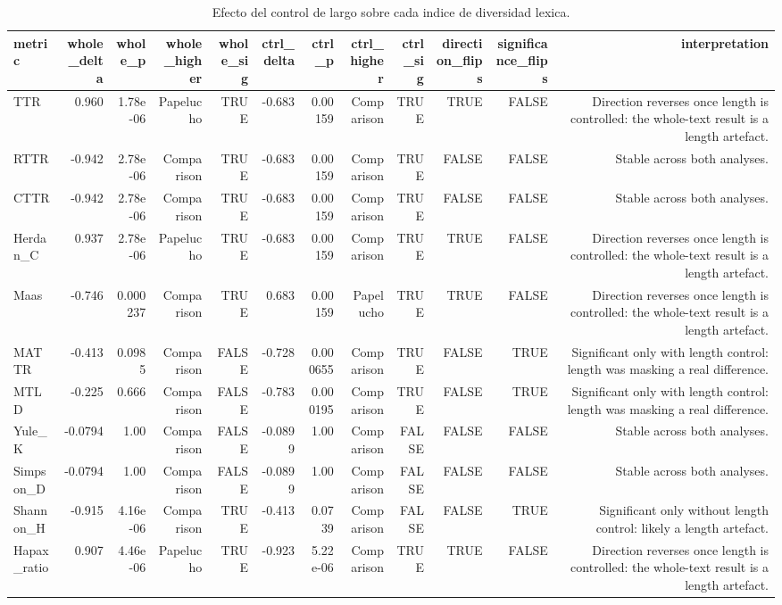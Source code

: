 \begin{table}[htbp]
\centering
\small
\caption{Efecto del control de largo sobre cada indice de diversidad lexica.}
\label{tab:lexical-contrast-es}
\begin{tabular}{lrrrrrrrrrrr}
\toprule
\textbf{metric} & \textbf{whole\_delta} & \textbf{whole\_p} & \textbf{whole\_higher} & \textbf{whole\_sig} & \textbf{ctrl\_delta} & \textbf{ctrl\_p} & \textbf{ctrl\_higher} & \textbf{ctrl\_sig} & \textbf{direction\_flips} & \textbf{significance\_flips} & \textbf{interpretation} \\
\midrule
TTR & 0.960 & 1.78e-06 & Papelucho & TRUE & -0.683 & 0.00159 & Comparison & TRUE & TRUE & FALSE & Direction reverses once length is controlled: the whole-text result is a length artefact. \\
RTTR & -0.942 & 2.78e-06 & Comparison & TRUE & -0.683 & 0.00159 & Comparison & TRUE & FALSE & FALSE & Stable across both analyses. \\
CTTR & -0.942 & 2.78e-06 & Comparison & TRUE & -0.683 & 0.00159 & Comparison & TRUE & FALSE & FALSE & Stable across both analyses. \\
Herdan\_C & 0.937 & 2.78e-06 & Papelucho & TRUE & -0.683 & 0.00159 & Comparison & TRUE & TRUE & FALSE & Direction reverses once length is controlled: the whole-text result is a length artefact. \\
Maas & -0.746 & 0.000237 & Comparison & TRUE & 0.683 & 0.00159 & Papelucho & TRUE & TRUE & FALSE & Direction reverses once length is controlled: the whole-text result is a length artefact. \\
MATTR & -0.413 & 0.0985 & Comparison & FALSE & -0.728 & 0.000655 & Comparison & TRUE & FALSE & TRUE & Significant only with length control: length was masking a real difference. \\
MTLD & -0.225 & 0.666 & Comparison & FALSE & -0.783 & 0.000195 & Comparison & TRUE & FALSE & TRUE & Significant only with length control: length was masking a real difference. \\
Yule\_K & -0.0794 & 1.00 & Comparison & FALSE & -0.0899 & 1.00 & Comparison & FALSE & FALSE & FALSE & Stable across both analyses. \\
Simpson\_D & -0.0794 & 1.00 & Comparison & FALSE & -0.0899 & 1.00 & Comparison & FALSE & FALSE & FALSE & Stable across both analyses. \\
Shannon\_H & -0.915 & 4.16e-06 & Comparison & TRUE & -0.413 & 0.0739 & Comparison & FALSE & FALSE & TRUE & Significant only without length control: likely a length artefact. \\
Hapax\_ratio & 0.907 & 4.46e-06 & Papelucho & TRUE & -0.923 & 5.22e-06 & Comparison & TRUE & TRUE & FALSE & Direction reverses once length is controlled: the whole-text result is a length artefact. \\
\bottomrule
\end{tabular}
\end{table}

